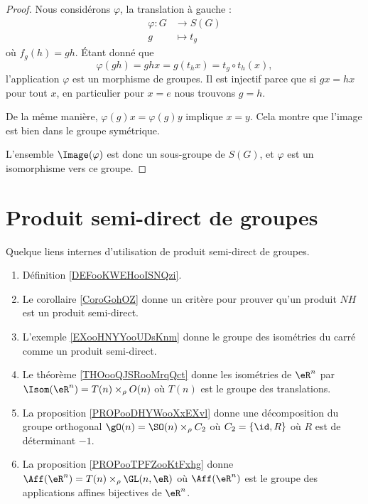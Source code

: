\begin{proof}
    Nous considérons \( \varphi\), la translation à gauche :
    \begin{equation}
        \begin{aligned}
            \varphi\colon G&\to S(G) \\
            g&\mapsto t_g 
        \end{aligned}
    \end{equation}
    où \( f_g(h)=gh\). Étant donné que
    \begin{equation}
        \varphi(gh)= ghx=g(t_hx)=t_g\circ t_h(x),
    \end{equation}
    l'application \( \varphi\) est un morphisme de groupes. Il est injectif parce que si \( gx=hx\) pour tout \( x\), en particulier pour \( x=e\) nous trouvons \( g=h\). 
    
    De la même manière, \( \varphi(g)x=\varphi(g)y\) implique \( x=y\). Cela montre que l'image est bien dans le groupe symétrique.

    L'ensemble \( \Image(\varphi)\) est donc un sous-groupe de \( S(G)\), et \( \varphi\) est un isomorphisme vers ce groupe.
\end{proof}

\section{Produit semi-direct de groupes}

\begin{InternalLinks}
    Quelque liens internes d'utilisation de produit semi-direct de groupes.
    \begin{enumerate}
        \item
            Définition \ref{DEFooKWEHooISNQzi}.
        \item
            Le corollaire \ref{CoroGohOZ} donne un critère pour prouver qu'un produit \( NH\) est un produit semi-direct.
        \item
            L'exemple \ref{EXooHNYYooUDsKnm} donne le groupe des isométries du carré comme un produit semi-direct.
        \item
            Le théorème \ref{THOooQJSRooMrqQct} donne les isométries de \( \eR^n\) par \( \Isom(\eR^n)=T(n)\times_{\rho} O(n)\) où \( T(n)\) est le groupe des translations.
        \item
            La proposition \ref{PROPooDHYWooXxEXvl} donne une décomposition du groupe orthogonal \( \gO(n)=\SO(n)\times_{\rho} C_2\) où \( C_2=\{ \id,R \}\) où \( R\) est de déterminant \( -1\).
        \item
            La proposition \ref{PROPooTPFZooKtFxhg} donne \( \Aff(\eR^n)=T(n)\times_{\rho}\GL(n,\eR)\) où \( \Aff(\eR^n)\) est le groupe des applications affines bijectives de \( \eR^n\).
    \end{enumerate}
\end{InternalLinks}

